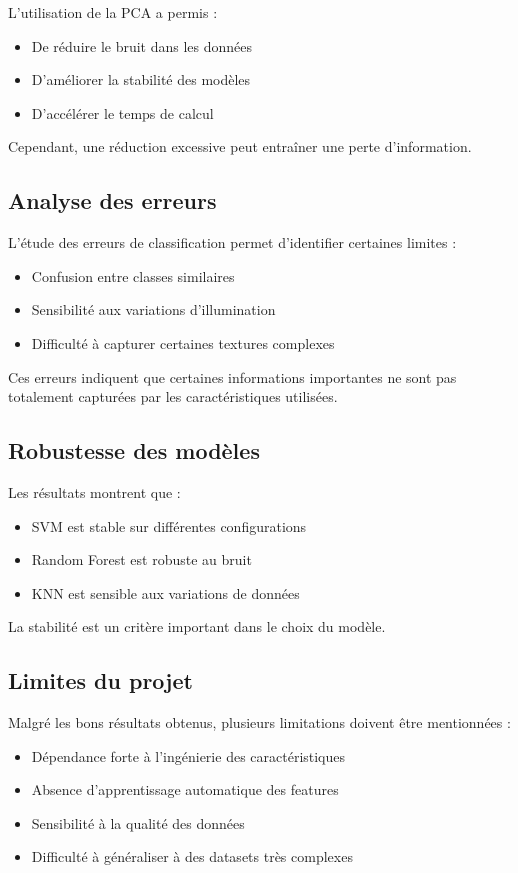 \documentclass[12pt,a4paper]{article}
\begin{document}
    L’utilisation de la PCA a permis :
    \begin{itemize}
        \item De réduire le bruit dans les données
        \item D’améliorer la stabilité des modèles
        \item D’accélérer le temps de calcul
    \end{itemize}

    Cependant, une réduction excessive peut entraîner une perte d’information.

    \subsection{Analyse des erreurs}

    L’étude des erreurs de classification permet d’identifier certaines limites :
    \begin{itemize}
        \item Confusion entre classes similaires
        \item Sensibilité aux variations d’illumination
        \item Difficulté à capturer certaines textures complexes
    \end{itemize}

    Ces erreurs indiquent que certaines informations importantes ne sont pas totalement capturées par les caractéristiques utilisées.

    \subsection{Robustesse des modèles}

    Les résultats montrent que :
    \begin{itemize}
        \item SVM est stable sur différentes configurations
        \item Random Forest est robuste au bruit
        \item KNN est sensible aux variations de données
    \end{itemize}

    La stabilité est un critère important dans le choix du modèle.

    \subsection{Limites du projet}

    Malgré les bons résultats obtenus, plusieurs limitations doivent être mentionnées :
    \begin{itemize}
        \item Dépendance forte à l’ingénierie des caractéristiques
        \item Absence d’apprentissage automatique des features
        \item Sensibilité à la qualité des données
        \item Difficulté à généraliser à des datasets très complexes
    \end{itemize}
\end{document}

